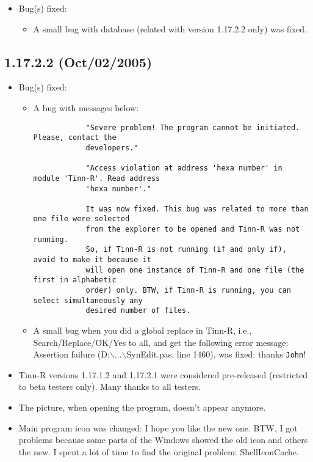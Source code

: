 \begin{itemize}
  \item Bug(s) fixed:
    \begin{itemize}
      \item A small bug with database (related with version 1.17.2.2 only)
        was fixed.
    \end{itemize}
\end{itemize}


\subsection{1.17.2.2 (Oct/02/2005)}

\begin{itemize}
  \item Bug(s) fixed:
    \begin{itemize}
      \item A bug with messages below:

        \begin{footnotesize}
          \begin{verbatim}
            "Severe problem! The program cannot be initiated. Please, contact the
            developers."

            "Access violation at address 'hexa number' in module 'Tinn-R'. Read address
            'hexa number'."

            It was now fixed. This bug was related to more than one file were selected
            from the explorer to be opened and Tinn-R was not running.
            So, if Tinn-R is not running (if and only if), avoid to make it because it
            will open one instance of Tinn-R and one file (the first in alphabetic
            order) only. BTW, if Tinn-R is running, you can select simultaneously any
            desired number of files.
          \end{verbatim}
        \end{footnotesize}

      \item A small bug when you did a global replace in Tinn-R, i.e.,
        Search/Replace/OK/Yes to all, and get the following error message:
        Assertion failure (D:$\backslash$...$\backslash$SynEdit.pas,
        line 1460), was fixed: thanks \texttt{John}!
    \end{itemize}
  \item Tinn-R versions 1.17.1.2 and 1.17.2.1 were considered pre-released
    (restricted to beta testers only). Many thanks to all testers.
  \item The picture, when opening the program, doesn't appear anymore.
  \item Main program icon was changed: I hope you like the new one.
    BTW, I got problems because some parts of the Windows showed the
    old icon and others the new. I spent a lot of time to find the
    original problem: ShellIconCache.


\end{itemize}

